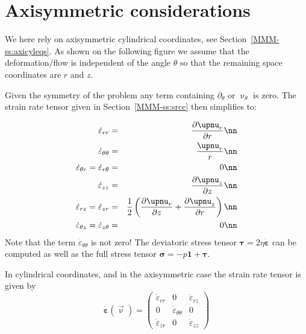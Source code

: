 \section*{Axisymmetric considerations}

We here rely on axisymmetric cylindrical coordinates, see Section~\ref{MMM-ss:axicyleqs}.
As shown on the following figure we assume that the deformation/flow is independent of the angle 
$\theta$ so that the remaining space coordinates are $r$ and $z$.
\begin{center}

\end{center}

Given the symmetry of the problem any term containing $\partial_\theta$ or $\upnu_\theta$ is zero.
The strain rate tensor given in Section~\ref{MMM-ss:srcc} then simplifies to:

\begin{eqnarray}
\dot\varepsilon_{rr} 
&=& \frac{\partial \upnu_r}{\partial r} \nn\\
\dot\varepsilon_{\theta\theta}  &=& \frac{\upnu_r}{r} \nn\\
\dot\varepsilon_{\theta r} = \dot\varepsilon_{r\theta}  &=& 0 \nn\\
\dot\varepsilon_{zz} &=& \frac{\partial \upnu_z}{\partial z} \nn\\
\dot{\varepsilon}_{rz} = \dot{\varepsilon}_{zr} 
&=& \frac{1}{2}\left( \frac{\partial \upnu_r}{\partial z} + \frac{\partial \upnu_z}{\partial r} \right) \nn\\
\dot{\varepsilon}_{\theta z} = \dot{\varepsilon}_{z \theta} &=& 0 \nn
\end{eqnarray}
Note that the term $\dot\varepsilon_{\theta\theta} $ is not zero!
The deviatoric stress tensor ${\bm \tau}=2\eta \dot{\bm \varepsilon}$ can be computed
as well as the full stress tensor ${\bm \sigma}=-p {\bm 1} + {\bm \tau}$. 


In cylindrical coordinates, and in the axisymmetric case
the strain rate tensor is given by
\[
\dot{\bm\varepsilon}(\vec\upnu)
=
\left(
\begin{array}{ccc}
\dot\varepsilon_{rr} & 0 & \dot{\varepsilon}_{rz} \\
0 & \dot{\varepsilon}_{\theta\theta}  & 0 \\
\dot{\varepsilon}_{zr} & 0 & \dot\varepsilon_{zz}
\end{array}
\right)
\]





